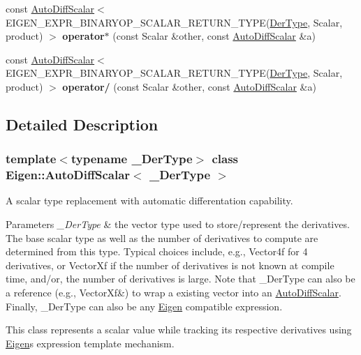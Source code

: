 \begin{DoxyCompactItemize}
\item 
\mbox{\label{class_eigen_1_1_auto_diff_scalar_aa2a5676cdfe4e7a3649da0784d971993}} 
const \hyperlink{class_eigen_1_1_auto_diff_scalar}{Auto\+Diff\+Scalar}$<$ E\+I\+G\+E\+N\+\_\+\+E\+X\+P\+R\+\_\+\+B\+I\+N\+A\+R\+Y\+O\+P\+\_\+\+S\+C\+A\+L\+A\+R\+\_\+\+R\+E\+T\+U\+R\+N\+\_\+\+T\+Y\+PE(\hyperlink{group___sparse_core___module}{Der\+Type}, Scalar, product) $>$ {\bfseries operator$\ast$} (const Scalar \&other, const \hyperlink{class_eigen_1_1_auto_diff_scalar}{Auto\+Diff\+Scalar} \&a)
\item 
\mbox{\label{class_eigen_1_1_auto_diff_scalar_a70599a82a101b28f383653884f52c21e}} 
const \hyperlink{class_eigen_1_1_auto_diff_scalar}{Auto\+Diff\+Scalar}$<$ E\+I\+G\+E\+N\+\_\+\+E\+X\+P\+R\+\_\+\+B\+I\+N\+A\+R\+Y\+O\+P\+\_\+\+S\+C\+A\+L\+A\+R\+\_\+\+R\+E\+T\+U\+R\+N\+\_\+\+T\+Y\+PE(\hyperlink{group___sparse_core___module}{Der\+Type}, Scalar, product) $>$ {\bfseries operator/} (const Scalar \&other, const \hyperlink{class_eigen_1_1_auto_diff_scalar}{Auto\+Diff\+Scalar} \&a)
\end{DoxyCompactItemize}


\subsection{Detailed Description}
\subsubsection*{template$<$typename \+\_\+\+Der\+Type$>$\newline
class Eigen\+::\+Auto\+Diff\+Scalar$<$ \+\_\+\+Der\+Type $>$}

A scalar type replacement with automatic differentation capability. 


\begin{DoxyParams}{Parameters}
{\em \+\_\+\+Der\+Type} & the vector type used to store/represent the derivatives. The base scalar type as well as the number of derivatives to compute are determined from this type. Typical choices include, e.\+g., {\ttfamily Vector4f} for 4 derivatives, or {\ttfamily Vector\+Xf} if the number of derivatives is not known at compile time, and/or, the number of derivatives is large. Note that \+\_\+\+Der\+Type can also be a reference (e.\+g., {\ttfamily Vector\+Xf\&}) to wrap a existing vector into an \hyperlink{class_eigen_1_1_auto_diff_scalar}{Auto\+Diff\+Scalar}. Finally, \+\_\+\+Der\+Type can also be any \hyperlink{namespace_eigen}{Eigen} compatible expression.\\
\hline
\end{DoxyParams}
This class represents a scalar value while tracking its respective derivatives using \hyperlink{namespace_eigen}{Eigen}\textquotesingle{}s expression template mechanism.

